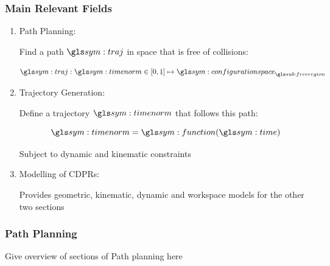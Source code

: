 \documentclass{beamer}
\begin{document}
	\begin{frame}
		\frametitle{Main Relevant Fields}

		\begin{enumerate}

			\item

				Path Planning:

				Find a path $\pathsym$ in space that is free of collisions:

				\begin{equation}
					\pathsym : \timenorm \in [0, 1] \mapsto \configurationspace_{\freeregion}
				\end{equation}


			\item

				Trajectory Generation:

				Define a trajectory $\timenorm$ that follows this path:

				\begin{equation}
					\timenorm = \function(\timesym)
				\end{equation}

				Subject to dynamic and kinematic constraints

			\item

				Modelling of CDPRs:

				Provides geometric, kinematic, dynamic and workspace models for
				the other two sections

		\end{enumerate}
	\end{frame}

	\begin{frame}
		\frametitle{Path Planning}

		Give overview of sections of Path planning here
	\end{frame}
\end{document}
